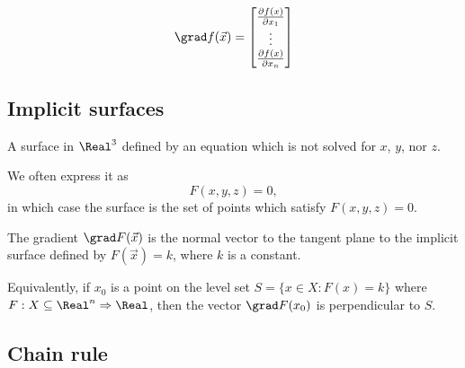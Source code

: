 \begin{definition}[Gradient]
  \[
    \grad f(\vec{x}) = \begin{bmatrix}
      \frac{\partial f(x)}{\partial x_1} \\
      \vdots \\
      \frac{\partial f(x)}{\partial x_n}
    \end{bmatrix}
  \]
\end{definition}

\subsection{Implicit surfaces}


\begin{definition}
  A surface in $\Real^3$ defined by an equation which is not solved for $x$, $y$, nor $z$.

  We often express it as
  \[
    F(x, y, z) = 0,
  \]
  in which case the surface is the set of points which satisfy $F(x, y, z) = 0$.
\end{definition}

\begin{theorem}
  The gradient $\grad F(\vec{x})$ is the normal vector to the tangent plane to the implicit surface defined by $F(\vec{x}) = k$, where $k$ is a constant.

  Equivalently, if $x_0$ is a point on the level set $S = \{ x \in X : F(x) = k \}$ where $F : X \subseteq \Real^n \Rightarrow \Real$, then the vector $\grad F(x_0)$ is perpendicular to $S$.
\end{theorem}

\subsection{Chain rule}


